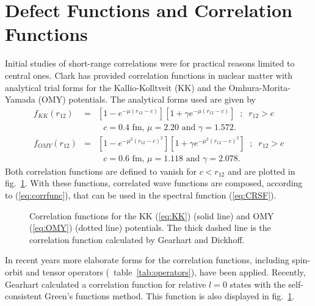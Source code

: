 \section{Defect Functions and Correlation Functions\label{sec:defect}}
Initial studies of short-range correlations were 
for practical reasons limited to central ones. Clark\cite{Cl81} 
has provided correlation functions in nuclear matter 
with analytical trial forms
for the 
Kallio-Kolltveit\cite{KK64} (KK) and the  Omhura-Morita-Yamada\cite{OMY56} 
(OMY) potentials. 
The analytical forms used are given by
%
	\begin{eqnarray}
		f_{KK}(r_{12}) 
	&=& 
		\left[
		1 - e^{ -\mu( r_{12}-c ) }
		\right]
		\left[
		1 + \gamma e^{ -\mu( r_{12}-c ) }
		\right] 
	\;\; 
	;
	\;\;
		r_{12} > c
	\label{eq:KK}
	\\
	&& \mbox{ $c=0.4$ fm, $\mu=2.20$ and $\gamma=1.572$. }
	\nonumber \\[10pt]
		f_{OMY}(r_{12}) 
	&=& 
		\left[
		1 - e^{ -\mu^2( r_{12}-c )^2 }
		\right]
		\left[
		1 + \gamma e^{ -\mu^2( r_{12}-c )^2 }
		\right] 
	\;\; 
	;
	\;\;
		 r_{12} > c
	\label{eq:OMY}
	\\
	&& \mbox{ $c=0.6$ fm, $\mu=1.118$ and $\gamma=2.078$. }
	\nonumber 
	\end{eqnarray}
%
Both correlation functions are defined to vanish for $c<r_{12}$ and are plotted
in fig.~\ref{fig:KKOMY}.
With these functions, correlated wave functions are composed,
according to (\ref{eq:corrfunc}), that can be used in the spectral function
(\ref{eq:CRSF}).
\begin{figure}
\centerline{
}
\vspace{0.5cm}
\caption[]{Correlation functions for the KK (\ref{eq:KK}) (solid line) and OMY 
(\ref{eq:OMY}) (dotted line) potentials. The thick dashed line is the 
correlation function calculated by Gearhart and Dickhoff\cite{GDPR95}.
\label{fig:KKOMY}
}
\end{figure}

In recent years more elaborate forms for the correlation functions, 
including spin-orbit and tensor operators (\cf\ table~\ref{tab:operators}),
have been applied\cite{CFFL92,CFF94}. 
Recently, Gearhart calculated a correlation function
for relative $l=0$ states
with the self-consistent Green's functions method\cite{GDPR95}. 
This function is also displayed in fig.~\ref{fig:KKOMY}.

